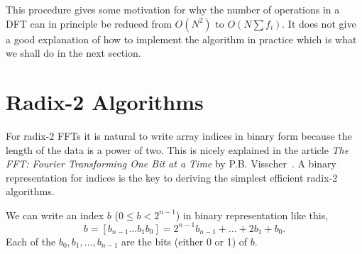 \documentclass[fleqn,12pt]{article}
\begin{document}
This procedure gives some motivation for why the number of operations
in a DFT can in principle be reduced from $O(N^2)$ to $O(N \sum f_i)$.
It does not give a good explanation of how to implement the algorithm
in practice which is what we shall do in the next section.

\section{Radix-2 Algorithms}
%
For radix-2 FFTs it is natural to write array indices in binary form
because the length of the data is a power of two. This is nicely
explained in the article {\em The FFT: Fourier Transforming One Bit at
a Time} by P.B. Visscher~\cite{visscher96}. A binary representation
for indices is the key to deriving the simplest efficient radix-2
algorithms.

We can write an index $b$ ($0 \leq b < 2^{n-1}$) in binary
representation like this,
%
\begin{equation}
b = [b_{n-1} \dots b_1 b_0] = 2^{n-1}b_{n-1} + \dots + 2 b_1 + b_0 .
\end{equation}
%
Each of the $b_0, b_1, \dots, b_{n-1}$ are the bits (either 0 or 1) of
$b$.
\end{document}
